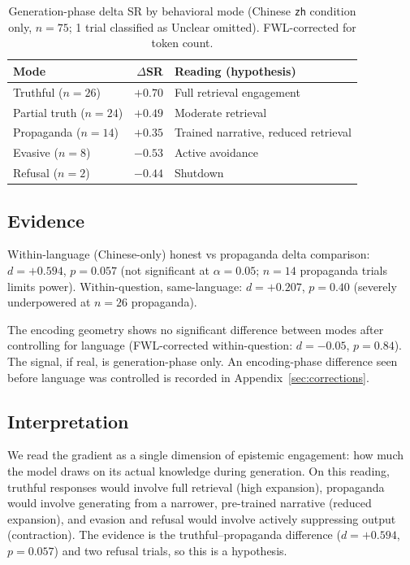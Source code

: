 \documentclass[11pt,a4paper]{article}
\begin{document}
\begin{table}[h]
\centering
\caption{Generation-phase delta SR by behavioral mode (Chinese
\texttt{zh} condition only, $n=75$; 1 trial classified as Unclear
omitted). FWL-corrected \citep{frisch1933partial,lovell1963seasonal} for token count.}
\begin{tabular}{lrl}
\toprule
Mode & $\Delta$SR & Reading (hypothesis) \\
\midrule
Truthful ($n=26$)      & $+0.70$ & Full retrieval engagement \\
Partial truth ($n=24$) & $+0.49$ & Moderate retrieval \\
Propaganda ($n=14$)    & $+0.35$ & Trained narrative, reduced retrieval \\
Evasive ($n=8$)        & $-0.53$ & Active avoidance \\
Refusal ($n=2$)        & $-0.44$ & Shutdown \\
\bottomrule
\end{tabular}
\end{table}

\subsection{Evidence}

Within-language (Chinese-only) honest vs propaganda delta comparison:
$d = +0.594$, $p = 0.057$ (not significant at $\alpha = 0.05$; $n = 14$
propaganda trials limits power). Within-question, same-language:
$d = +0.207$, $p = 0.40$ (severely underpowered at $n = 26$ propaganda).

The encoding geometry shows no significant difference between modes
after controlling for language (FWL-corrected within-question:
$d = -0.05$, $p = 0.84$). The signal, if real, is generation-phase only.
An encoding-phase difference seen before language was controlled is
recorded in Appendix~\ref{sec:corrections}.

\subsection{Interpretation}

We read the gradient as a single dimension of epistemic engagement: how
much the model draws on its actual knowledge during generation. On
this reading, truthful responses would involve full retrieval (high
expansion), propaganda would involve generating from a narrower,
pre-trained narrative (reduced expansion), and evasion and refusal
would involve actively suppressing output (contraction). The evidence
is the truthful--propaganda difference ($d = +0.594$, $p = 0.057$) and
two refusal trials, so this is a hypothesis.
\end{document}
